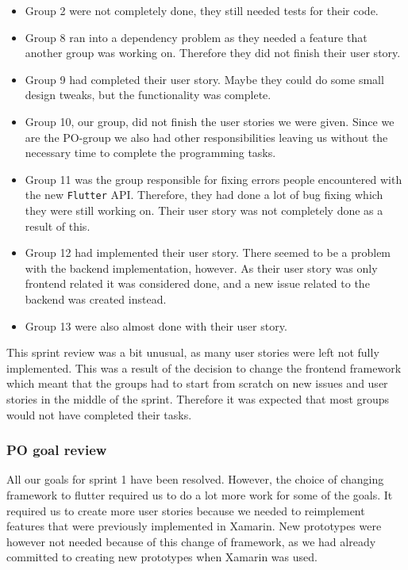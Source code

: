 \begin{itemize}
    \item Group 2 were not completely done, they still needed tests for their code.
    \item Group 8 ran into a dependency problem as they needed a feature that another group was working on. Therefore they did not finish their user story.
    \item Group 9 had completed their user story. Maybe they could do some small design tweaks, but the functionality was complete.
    \item Group 10, our group, did not finish the user stories we were given. Since we are the PO-group we also had other responsibilities leaving us without the necessary time to complete the programming tasks.
    \item Group 11 was the group responsible for fixing errors people encountered with the new \texttt{Flutter} API. Therefore, they had done a lot of bug fixing which they were still working on. Their user story was not completely done as a result of this.
    \item Group 12 had implemented their user story. There seemed to be a problem with the backend implementation, however. As their user story was only frontend related it was considered done, and a new issue related to the backend was created instead.
    \item Group 13 were also almost done with their user story.
\end{itemize}
\noindent
This sprint review was a bit unusual, as many user stories were left not fully implemented. This was a result of the decision to change the frontend framework which meant that the groups had to start from scratch on new issues and user stories in the middle of the sprint.
Therefore it was expected that most groups would not have completed their tasks.

\subsubsection{PO goal review}
All our goals for sprint 1 have been resolved. 
However, the choice of changing framework to flutter required us to do a lot more work for some of the goals.
It required us to create more user stories because we needed to reimplement features that were previously implemented in Xamarin.
New prototypes were however not needed because of this change of framework, as we had already committed to creating new prototypes when Xamarin was used.

